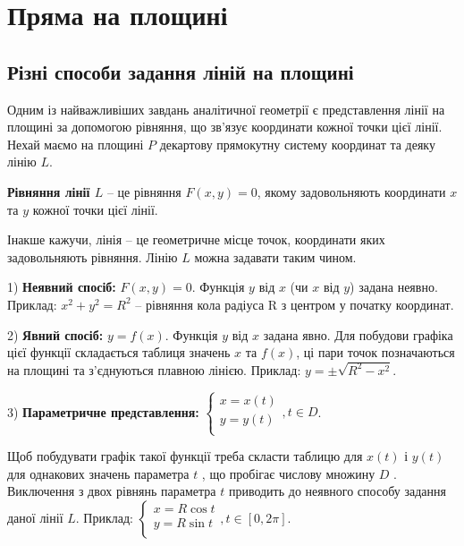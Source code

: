 \section{Пряма на площині}

\subsection{Різні способи задання ліній на площині}

Одним із найважливіших завдань аналітичної геометрії є представлення лінії
на площині за допомогою рівняння, що зв’язує координати кожної точки цієї лінії.
Нехай маємо на площині $P$ декартову прямокутну систему координат та деяку
лінію $L$.

\begin{definition}
	\textbf{Рівняння лінії $L$} -- це рівняння $F(x,y) = 0$, якому задовольняють
	координати $x$ та $y$ кожної точки цієї лінії. 
\end{definition}

Інакше кажучи, лінія – це геометричне місце точок, координати яких
задовольняють рівняння. Лінію $L$ можна задавати таким чином. 

1) \textbf{Неявний спосіб:} $F(x,y) = 0$. Функція $y$ від $x$ (чи $x$ від $y$) задана неявно.
Приклад: $x^2 + y^2 = R^2$ -- рівняння кола радіуса R з центром у початку координат.

2) \textbf{Явний спосіб:} $y = f(x)$. Функція $y$ від $x$ задана явно. Для побудови графіка
цієї функції складається таблиця значень $x$ та $f(x)$, ці пари точок позначаються на
площині та з’єднуються плавною лінією.
Приклад: $y = \pm\sqrt{R^2 - x^2}$. 

3) \textbf{Параметричне представлення:} $\left\{\begin{array}{l}
	x = x(t) \\
	y = y(t) \\	
\end{array}\right., t \in D$.
	
Щоб побудувати графік
такої функції треба скласти таблицю для $x(t)$ і $y(t)$ для однакових значень
параметра $t$ , що пробігає числову множину $D$ . Виключення з двох рівнянь
параметра $t$ приводить до неявного способу задання даної лінії $L$. 
Приклад: $\left\{\begin{array}{l}
	x = R\cos t \\
	y = R\sin t \\	
\end{array}\right., t \in [0, 2\pi]$.

